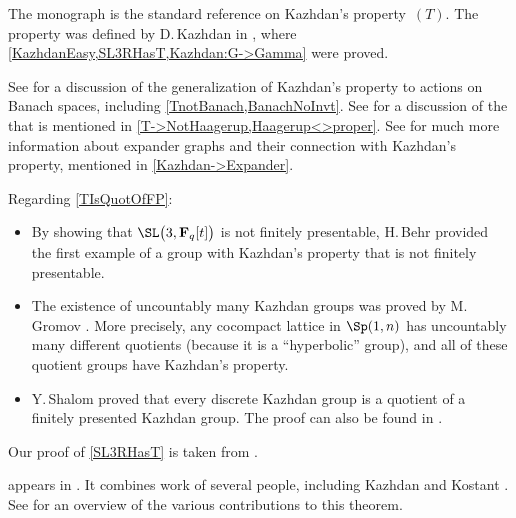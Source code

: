 \begin{notes}

The monograph \cite{BekkaHarpeValette-T} is the standard reference on Kazhdan's property~$(T)$. 
The property was defined by D.\,Kazhdan in \cite{KazhdanT}, where \cref{KazhdanEasy,SL3RHasT,Kazhdan:G->Gamma} were proved.

See \cite{BaderFurmanGelanderMonod-BanachT} for a discussion of the generalization of Kazhdan's property to actions on Banach spaces, including \cref{TnotBanach,BanachNoInvt}.
See \cite{CherixEtAl-Haagerup} for a discussion of the  that is mentioned in \cref{T->NotHaagerup,Haagerup<>proper}.
See \cite{Lubotzky-ExpandingGrps} for much more information about expander graphs and their connection with Kazhdan's property, mentioned in \cref{Kazhdan->Expander}.

Regarding \cref{TIsQuotOfFP}:
\noprelistbreak
	\begin{itemize} %
	\item By showing that $\SL\bigl( 3, \mathbf{F}_q[t] \bigr)$ is not finitely presentable, H.\,Behr \cite{Behr-SL3NotFP} provided the first example of a group with Kazhdan's property that is not finitely presentable.
	\item The existence of uncountably many Kazhdan groups was proved by M.\,Gromov \cite[Cor.~5.5.E, p.~150]{Gromov-HypGrp}. More precisely, any cocompact lattice in $\Sp(1,n)$ has uncountably many different quotients (because it is a ``hyperbolic'' group), and all of these quotient groups have Kazhdan's property.
	\item Y.\,Shalom \cite[p.~5]{Shalom-RigidCommens} proved that every discrete Kazhdan group is a quotient of a finitely presented Kazhdan group. The proof can also be found in 
\cite[Thm.~3.4.5, p.~187]{BekkaHarpeValette-T}.
	\end{itemize}

Our proof of \cref{SL3RHasT} is taken from \cite[\S1.4]{BekkaHarpeValette-T}. 

 appears in \cite[Thm.~3.5.4, p.~177]{BekkaHarpeValette-T}. It combines work of several people, including Kazhdan \cite{KazhdanT} %
and Kostant \cite{Kostant-Tannounce,Kostant-Tpaper}. See \cite[pp.~5--7]{BekkaHarpeValette-T} for an overview of the various contributions to this theorem.


\end{notes}
